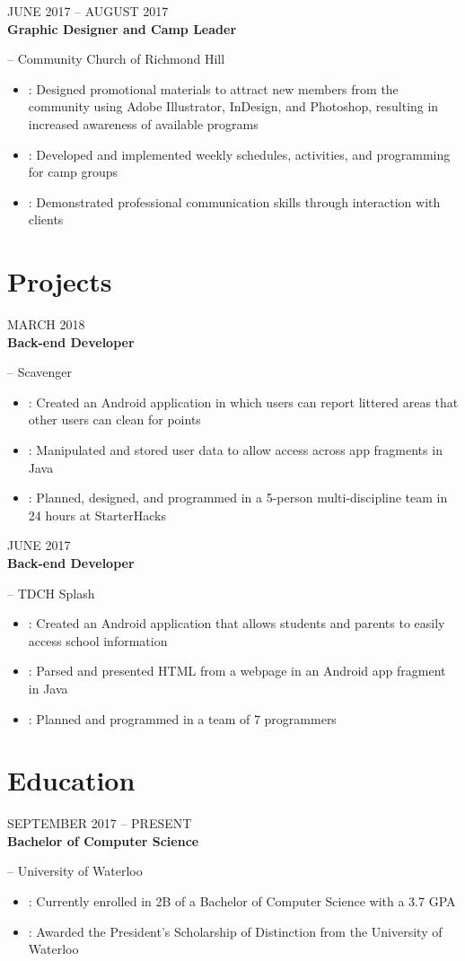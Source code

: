 \documentclass[letterpaper, 11pt]{article}
\newcommand{\styleDate}[1]{
    {{\color{resGray}\MakeTextUppercase{#1}}}
}
\newcommand{\styleDescription}[1]{
    {\color{resGray}#1}
}
\newcommand{\styleEmployer}[1]{
    {\Large{\color{resGray}#1}}
}
\newcommand{\stylePosition}[1]{
    {\Large{\textbf{\color{resBlue}#1}}}
}
\newcommand{\resBulletPoint}[2][]{
    \item\styleDescription{
        \ifthenelse
            {\isempty{#1}}
            {}
            {\textbf{#1}: }
        #2
    }
}
\newcommand{\resItem}[3]{   
    \vspace{6pt} 
    \styleDate{#3} \\
    \stylePosition{#1}\styleEmployer{-- #2}
}
\newenvironment{resElement}[1][]{
    #1
    \begin{itemize}[leftmargin=2ex, nosep, noitemsep]
}{
    \end{itemize}
}
\begin{document}
    \begin{resElement}[
        \resItem
        {Graphic Designer and Camp Leader}
        {Community Church of Richmond Hill}
        {June 2017 -- August 2017}
    ]
        \resBulletPoint{Designed promotional materials to attract new members from the community using Adobe Illustrator, InDesign, and Photoshop, resulting in increased awareness of available programs}
        \resBulletPoint{Developed and implemented weekly schedules, activities, and programming for camp groups}
        \resBulletPoint{Demonstrated professional communication skills through interaction with clients}
    \end{resElement}

\section{Projects}
    \begin{resElement}[
        \resItem
        {Back-end Developer}
        {Scavenger}
        {March 2018}
    ]
        \resBulletPoint{Created an Android application in which users can report littered areas that other users can clean for points}
        \resBulletPoint{Manipulated and stored user data to allow access across app fragments in Java}
        \resBulletPoint{Planned, designed, and programmed in a 5-person multi-discipline team in 24 hours at StarterHacks}
    \end{resElement}

    \begin{resElement}[
        \resItem
        {Back-end Developer}
        {TDCH Splash}
        {June 2017}
    ]
        \resBulletPoint{Created an Android application that allows students and parents to easily access school information}
        \resBulletPoint{Parsed and presented HTML from a webpage in an Android app fragment in Java }
        \resBulletPoint{Planned and programmed in a team of 7 programmers}
    \end{resElement}
    
\section{Education}
    \begin{resElement}[
        \resItem
        {Bachelor of Computer Science}
        {University of Waterloo}
        {September 2017 -- Present}
    ]
        \resBulletPoint{Currently enrolled in 2B of a Bachelor of Computer Science with a 3.7 GPA}
        \resBulletPoint{Awarded the President’s Scholarship of Distinction from the University of Waterloo}
    \end{resElement}
\end{document}
